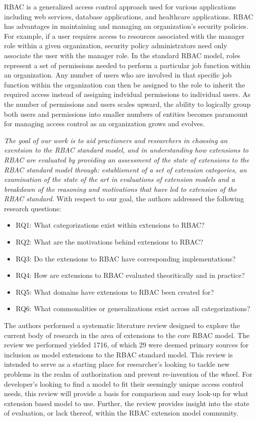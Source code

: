 RBAC is a generalized access control approach used for various applications including web services, database applications, and healthcare applications.  
RBAC has advantages in maintaining and managing an organization's security policies.  
For example, if a user requires access to resources associated with the manager role within a given organization, security policy administrators need only associate the user with the manager role.
In the standard RBAC model, roles represent a set of permissions needed to perform a particular job function within an organization.  
Any number of users who are involved in that specific job function within the organization can then be assigned to the role to inherit the required access instead of assigning indvidual permissions to individual users. 
As the number of permissions and users scales upward, the ability to logically group both users and permissions into smaller numbers of entities becomes paramount for managing access control as an organization grows and evolves.

\textit{The goal of our work is to aid practioners and researchers in choosing an exentsion to the RBAC standard model, and in understanding
how extensions to RBAC are evaluated by providing an assessment of the state of extensions to the RBAC standard model through: establisment of a 
set of extension categories, an examination of the state of the art in evaluations of extension models and a breakdown of the reasoning and motivations
that have led to extension of the RBAC standard.} With respect to our goal, the authors addressed the following research questions:

\begin{itemize}
\setlength{\itemsep}{0.25pt}
\item RQ1: What categorizations exist within extensions to RBAC?
\item RQ2: What are the motivations behind extensions to RBAC?
\item RQ3: Do the extensions to RBAC have corresponding implementations?
\item RQ4: How are extensions to RBAC evaluated theoritically and in practice?
\item RQ5: What domains have extensions to RBAC been created for?
\item RQ6: What commonalities or generalizations exist across all categorizations?
\end{itemize}

The authors performed a systematic literature review designed to explore the current body of research in the area of extensions to the core RBAC model.  The review we performed yielded 1716, of which 29 were deemed primary sources for inclusion as model extensions to the RBAC standard model.  This review is intended to serve as a starting place for researcher's looking to tackle new problems in the realm of authorization and prevent re-invention of the wheel. For developer's looking to find a model to fit their seemingly unique access control needs, this review will provide a basis for comparison and easy look-up for what extension based model to use.  Further, the review provides insight into the state of evaluation, or lack thereof, within the RBAC extension model community.

